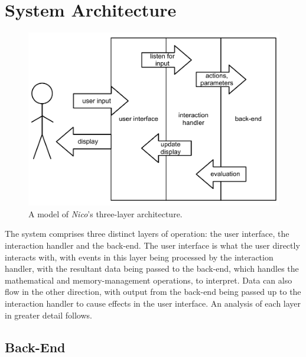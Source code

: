\documentclass[12pt,twoside,notitlepage,xetex]{report}
\begin{document}
\section{System Architecture}

\begin{center}
\begin{figure}[H]
\begin{center}
\includegraphics[width=\textwidth-2cm]{figs/nico_arch.pdf}
\end{center}
\caption{A model of \emph{Nico}'s three-layer architecture.}
\label{fig:NicoArch}
\end{figure}
\end{center}

The system comprises three distinct layers of operation: the user interface, the interaction handler and the back-end.  The user interface is what the user directly interacts with, with events in this layer being processed by the interaction handler, with the resultant data being passed to the back-end, which handles the mathematical and memory-management operations, to interpret.  Data can also flow in the other direction, with output from the back-end being passed up to the interaction handler to cause effects in the user interface.  An analysis of each layer in greater detail follows.

\subsection{Back-End}
\end{document}
